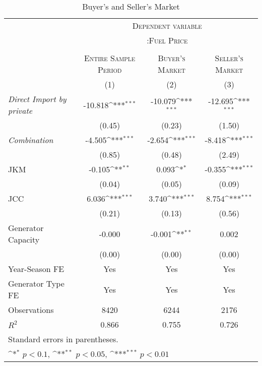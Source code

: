 \documentclass[12pt]{article}
\begin{document}
\begin{table}[htbp]\centering
\def\sym#1{\ifmmode^{#1}\else\(^{#1}\)\fi}
\caption{Buyer's and Seller's Market\label{tab1}}
\renewcommand{\arraystretch}{0.8}
\begin{tabular}{l*{3}{c}}
\toprule
 & \multicolumn{3}{c}{\textsc{Dependent variable}} \\ 
                     &\multicolumn{3}{c}{\textsc{:Fuel Price}}\\
                                          \cline{2-4}  \\
                  &\multicolumn{1}{c}{\textsc{Entire Sample Period}}&\multicolumn{1}{c}{\textsc{Buyer's Market}}&\multicolumn{1}{c}{\textsc{Seller's Market}}\\                                          
                    &\multicolumn{1}{c}{(1)}&\multicolumn{1}{c}{(2)}&\multicolumn{1}{c}{(3)}\\

\hline \hline
\addlinespace
\textit{Direct Import by private}               &     -10.818\sym{***}&     -10.079\sym{***}&     -12.695\sym{***}\\
                    &      (0.45)         &      (0.23)         &      (1.50)         \\
\addlinespace
\textit{Combination}  &      -4.505\sym{***}&      -2.654\sym{***}&      -8.418\sym{***}\\
                    &      (0.85)         &      (0.48)         &      (2.49)         \\
\addlinespace
JKM                 &      -0.105\sym{**} &       0.093\sym{*}  &      -0.355\sym{***}\\
                    &      (0.04)         &      (0.05)         &      (0.09)         \\
\addlinespace
JCC                 &       6.036\sym{***}&       3.740\sym{***}&       8.754\sym{***}\\
                    &      (0.21)         &      (0.13)         &      (0.56)         \\
\addlinespace
Generator Capacity          &      -0.000         &      -0.001\sym{**} &       0.002         \\
                    &      (0.00)         &      (0.00)         &      (0.00)         \\
\midrule
Year-Season FE        &    Yes &    Yes&    Yes\\  
Generator Type FE       &    Yes &    Yes&    Yes\\  
Observations                  &    8420         &    6244         &    2176         \\
$R^2$                  &       0.866         &       0.755         &       0.726         \\
\bottomrule
\multicolumn{4}{l}{\footnotesize Standard errors in parentheses.}\\
\multicolumn{4}{l}{\footnotesize \sym{*} \(p<0.1\), \sym{**} \(p<0.05\), \sym{***} \(p<0.01\)}\\
\end{tabular}
\end{table}
\end{document}
